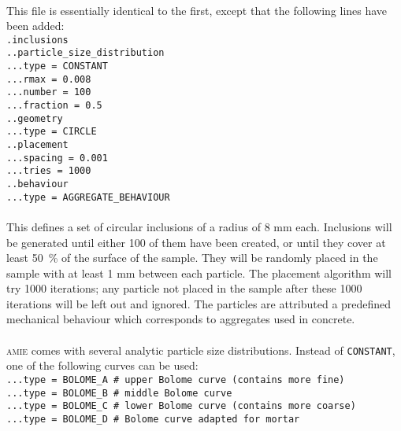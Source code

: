\documentclass[10pt]{article}
\begin{document}
\paragraph{}This file is essentially identical to the first, except that the following lines have been added:\\

\noindent \verb+.inclusions+\\
\verb+..particle_size_distribution+\\
\verb+...type = CONSTANT+\\
\verb+...rmax = 0.008+\\
\verb+...number = 100+\\
\verb+...fraction = 0.5+\\
\verb+..geometry+\\
\verb+...type = CIRCLE+\\
\verb+..placement+\\
\verb+...spacing = 0.001+\\
\verb+...tries = 1000+\\
\verb+..behaviour+\\
\verb+...type = AGGREGATE_BEHAVIOUR+


\paragraph{}This defines a set of circular inclusions of a radius of 8 mm each. Inclusions will be generated until either 100 of them have been created, or until they cover at least 50~\% of the surface of the sample. They will be randomly placed in the sample with at least 1 mm between each particle. The placement algorithm will try 1000 iterations; any particle not placed in the sample after these 1000 iterations will be left out and ignored. The particles are attributed a predefined mechanical behaviour which corresponds to aggregates used in concrete.

\paragraph{}\textsc{amie} comes with several analytic particle size distributions. Instead of \verb+CONSTANT+, one of the following curves can be used:\\

\noindent \verb+...type = BOLOME_A # upper Bolome curve (contains more fine)+\\
\verb+...type = BOLOME_B # middle Bolome curve+\\
\verb+...type = BOLOME_C # lower Bolome curve (contains more coarse)+\\
\verb+...type = BOLOME_D # Bolome curve adapted for mortar+
\end{document}
